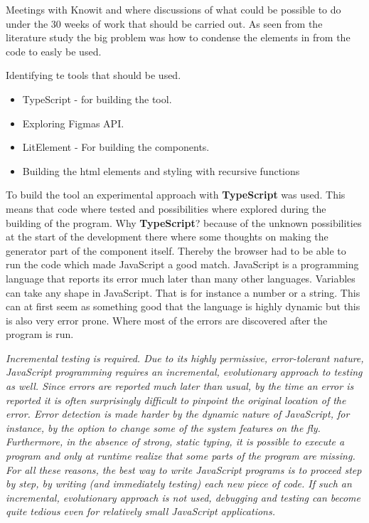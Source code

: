 Meetings with Knowit and where discussions of what could be possible to do under the 30 weeks of work that should be carried out. As seen from the literature study the big problem was how to condense the elements in from the code to easly be used. 

Identifying te tools that should be used.
\begin{itemize}
  \item TypeScript - for building the tool.
  \item Exploring Figmas API.
  \item LitElement - For building the components. 
  \item Building the html elements and styling with recursive functions
\end{itemize}

To build the tool an experimental approach with \textbf{TypeScript} was used. This means that code where tested and possibilities where explored during the building of the program. Why \textbf{TypeScript}? because of the unknown possibilities at the start of the development there where some thoughts on making the generator part of the component itself. Thereby the browser had to be able to run the code which made JavaScript a good match. JavaScript is a programming language that reports its error much later than many other languages. Variables can take any shape in JavaScript. That is for instance a number or a string. This can at first seem as something good that the language is highly dynamic but this is also very error prone. Where most of the errors are discovered after the program is run. 


\textit{Incremental testing is required. Due to its highly permissive, error-tolerant nature, JavaScript programming requires an incremental, evolutionary approach to testing as well. Since errors are reported much later than usual, by the time an error is reported it is often surprisingly difficult to pinpoint the original location of the error. Error detection is made harder by the dynamic nature of JavaScript, for instance, by the option to change some of the system features on the fly. Furthermore, in the absence of strong, static typing, it is possible to execute a program and only at runtime realize that some parts of the program are missing. For all these reasons, the best way to write JavaScript programs is to proceed step by step, by writing (and immediately testing) each new piece of code. If such an incremental, evolutionary approach is not used, debugging and testing can become quite tedious even for relatively small JavaScript applications.} \cite{taivalsaari2008web} 





